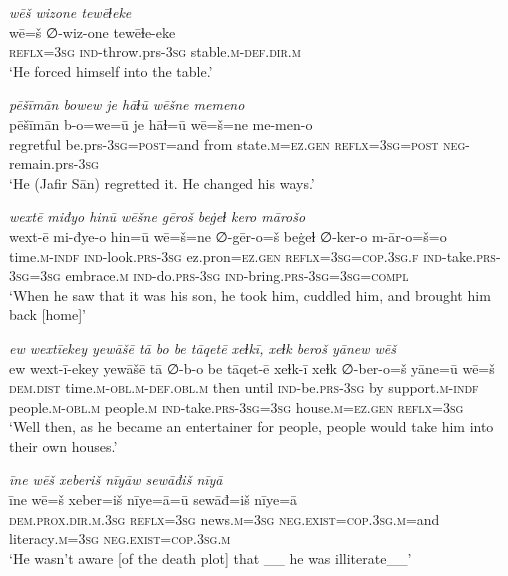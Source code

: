 \ea \label{ŠJ.65}
\textit{wēš wizone tewēɫeke} \\ 
\gll wē=š ∅-wiz-one tewēɫe-eke \\ 
 \textsc{reflx}\textsc{=3sg} \textsc{ind-}throw.prs\textsc{-3sg} stable\textsc{.m}\textsc{-def}\textsc{.dir}\textsc{.m} \\ 
\glt `He forced himself into the table.'
\z 
 
\ea \label{ŠJ.95}
\textit{pēšīmān bowew je hāɫū wēšne memeno} \\ 
\gll pēšīmān b-o=we=ū je hāɫ=ū wē=š=ne me-men-o \\ 
 regretful be.prs\textsc{-3sg}\textsc{=\textsc{post}}=and from state\textsc{.m}\textsc{=ez.gen} \textsc{reflx}\textsc{=3sg}\textsc{=\textsc{post}} \textsc{neg-}remain.prs\textsc{-3sg} \\ 
\glt `He (Jafir Sān) regretted it. He changed his ways.'
\z 
 
\ea \label{KŠ.32}
\textit{wextē miđyo hinū wēšne gēroš beġeɫ kero mārošo} \\ 
\gll wext-ē mi-đye-o hin=ū wē=š=ne ∅-gēr-o=š beġeɫ ∅-ker-o m-ār-o=š=o \\ 
 time\textsc{.m}\textsc{-indf} \textsc{ind-}look\textsc{.prs}\textsc{-3sg} ez.pron\textsc{=ez.gen} \textsc{reflx}\textsc{=3sg}\textsc{=cop}\textsc{.3sg}\textsc{.f} \textsc{ind-}take\textsc{.prs}\textsc{-3sg}\textsc{=3sg} embrace\textsc{.m} \textsc{ind-}do\textsc{.prs}\textsc{-3sg} \textsc{ind-}bring\textsc{.prs}\textsc{-3sg}\textsc{=3sg}\textsc{=compl} \\ 
\glt `When he saw that it was his son, he took him, cuddled him, and brought him back [home]'
\z 
 
\ea \label{KŠ.38}
\textit{ew wextīekey yewāšē tā bo be tāqetē xeɫkī, xeɫk beroš yānew wēš} \\ 
\gll ew wext-ī-ekey yewāšē tā ∅-b-o be tāqet-ē xeɫk-ī xeɫk ∅-ber-o=š yāne=ū wē=š \\ 
 \textsc{dem.dist} time\textsc{.m}\textsc{-obl}\textsc{.m}\textsc{-def}\textsc{.obl}\textsc{.m} then until \textsc{ind-}be\textsc{.prs}\textsc{-3sg} by support\textsc{.m}\textsc{-indf} people\textsc{.m}\textsc{-obl}\textsc{.m} people\textsc{.m} \textsc{ind-}take\textsc{.prs}\textsc{-3sg}\textsc{=3sg} house\textsc{.m}\textsc{=ez.gen} \textsc{reflx}\textsc{=3sg} \\ 
\glt `Well then, as he became an entertainer for people, people would take him into their own houses.'
\z 
 
\ea \label{KŠ.76}
\textit{īne wēš xeberiš nīyāw sewāđiš nīyā} \\ 
\gll īne wē=š xeber=iš nīye=ā=ū sewāđ=iš nīye=ā \\ 
 \textsc{dem.prox}\textsc{.dir}\textsc{.m}\textsc{.3sg} \textsc{reflx}\textsc{=3sg} news\textsc{.m}\textsc{=3sg} \textsc{\textsc{neg.}exist}\textsc{=cop}\textsc{.3sg}\textsc{.m}=and literacy\textsc{.m}\textsc{=3sg} \textsc{\textsc{neg.}exist}\textsc{=cop}\textsc{.3sg}\textsc{.m} \\ 
\glt `He wasn’t aware [of the death plot] that \_\_ he was illiterate\_\_'
\z 
 
